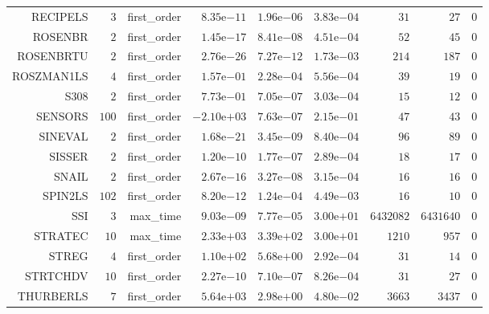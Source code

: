 \begin{longtable}{rrrrrrrrr}
RECIPELS & \(     3\) & first\_order & \( 8.35\)e\(-11\) & \( 1.96\)e\(-06\) & \( 3.83\)e\(-04\) & \(    31\) & \(    27\) & \(     0\) \\
ROSENBR & \(     2\) & first\_order & \( 1.45\)e\(-17\) & \( 8.41\)e\(-08\) & \( 4.51\)e\(-04\) & \(    52\) & \(    45\) & \(     0\) \\
ROSENBRTU & \(     2\) & first\_order & \( 2.76\)e\(-26\) & \( 7.27\)e\(-12\) & \( 1.73\)e\(-03\) & \(   214\) & \(   187\) & \(     0\) \\
ROSZMAN1LS & \(     4\) & first\_order & \( 1.57\)e\(-01\) & \( 2.28\)e\(-04\) & \( 5.56\)e\(-04\) & \(    39\) & \(    19\) & \(     0\) \\
S308 & \(     2\) & first\_order & \( 7.73\)e\(-01\) & \( 7.05\)e\(-07\) & \( 3.03\)e\(-04\) & \(    15\) & \(    12\) & \(     0\) \\
SENSORS & \(   100\) & first\_order & \(-2.10\)e\(+03\) & \( 7.63\)e\(-07\) & \( 2.15\)e\(-01\) & \(    47\) & \(    43\) & \(     0\) \\
SINEVAL & \(     2\) & first\_order & \( 1.68\)e\(-21\) & \( 3.45\)e\(-09\) & \( 8.40\)e\(-04\) & \(    96\) & \(    89\) & \(     0\) \\
SISSER & \(     2\) & first\_order & \( 1.20\)e\(-10\) & \( 1.77\)e\(-07\) & \( 2.89\)e\(-04\) & \(    18\) & \(    17\) & \(     0\) \\
SNAIL & \(     2\) & first\_order & \( 2.67\)e\(-16\) & \( 3.27\)e\(-08\) & \( 3.15\)e\(-04\) & \(    16\) & \(    16\) & \(     0\) \\
SPIN2LS & \(   102\) & first\_order & \( 8.20\)e\(-12\) & \( 1.24\)e\(-04\) & \( 4.49\)e\(-03\) & \(    16\) & \(    10\) & \(     0\) \\
SSI & \(     3\) & max\_time & \( 9.03\)e\(-09\) & \( 7.77\)e\(-05\) & \( 3.00\)e\(+01\) & \(6432082\) & \(6431640\) & \(     0\) \\
STRATEC & \(    10\) & max\_time & \( 2.33\)e\(+03\) & \( 3.39\)e\(+02\) & \( 3.00\)e\(+01\) & \(  1210\) & \(   957\) & \(     0\) \\
STREG & \(     4\) & first\_order & \( 1.10\)e\(+02\) & \( 5.68\)e\(+00\) & \( 2.92\)e\(-04\) & \(    31\) & \(    14\) & \(     0\) \\
STRTCHDV & \(    10\) & first\_order & \( 2.27\)e\(-10\) & \( 7.10\)e\(-07\) & \( 8.26\)e\(-04\) & \(    31\) & \(    27\) & \(     0\) \\
THURBERLS & \(     7\) & first\_order & \( 5.64\)e\(+03\) & \( 2.98\)e\(+00\) & \( 4.80\)e\(-02\) & \(  3663\) & \(  3437\) & \(     0\) \\

\end{longtable}
